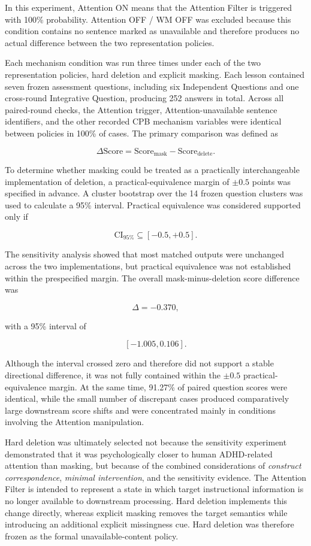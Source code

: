 In this experiment, Attention ON means that the Attention Filter is triggered with 100\% probability. Attention OFF / WM OFF was excluded because this condition contains no sentence marked as unavailable and therefore produces no actual difference between the two representation policies.

Each mechanism condition was run three times under each of the two representation policies, hard deletion and explicit masking. Each lesson contained seven frozen assessment questions, including six Independent Questions and one cross-round Integrative Question, producing 252 answers in total. Across all paired-round checks, the Attention trigger, Attention-unavailable sentence identifiers, and the other recorded CPB mechanism variables were identical between policies in 100\% of cases. The primary comparison was defined as

\[
\Delta \mathrm{Score}
=
\mathrm{Score}_{\mathrm{mask}}
-
\mathrm{Score}_{\mathrm{delete}}.
\]

To determine whether masking could be treated as a practically interchangeable implementation of deletion, a practical-equivalence margin of \(\pm 0.5\) points was specified in advance. A cluster bootstrap over the 14 frozen question clusters was used to calculate a 95\% interval. Practical equivalence was considered supported only if

\[
\mathrm{CI}_{95\%}
\subseteq
[-0.5,+0.5].
\]

The sensitivity analysis showed that most matched outputs were unchanged across the two implementations, but practical equivalence was not established within the prespecified margin. The overall mask-minus-deletion score difference was

\[
\Delta=-0.370,
\]

with a 95\% interval of

\[
[-1.005,0.106].
\]

Although the interval crossed zero and therefore did not support a stable directional difference, it was not fully contained within the \(\pm 0.5\) practical-equivalence margin. At the same time, 91.27\% of paired question scores were identical, while the small number of discrepant cases produced comparatively large downstream score shifts and were concentrated mainly in conditions involving the Attention manipulation.

Hard deletion was ultimately selected not because the sensitivity experiment demonstrated that it was psychologically closer to human ADHD-related attention than masking, but because of the combined considerations of \textit{construct correspondence}, \textit{minimal intervention}, and the sensitivity evidence. The Attention Filter is intended to represent a state in which target instructional information is no longer available to downstream processing. Hard deletion implements this change directly, whereas explicit masking removes the target semantics while introducing an additional explicit missingness cue. Hard deletion was therefore frozen as the formal unavailable-content policy.

